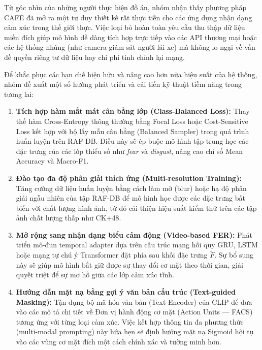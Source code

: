 Từ góc nhìn của những người thực hiện đồ án, nhóm nhận thấy phương pháp CAFE đã mở ra một tư duy thiết kế rất thực tiễn cho các ứng dụng nhận dạng cảm xúc trong thế giới thực. Việc loại bỏ hoàn toàn yêu cầu thu thập dữ liệu miền đích giúp mô hình dễ dàng tích hợp trực tiếp vào các API thương mại hoặc các hệ thống nhúng (như camera giám sát người lái xe) mà không lo ngại về vấn đề quyền riêng tư dữ liệu hay chi phí tinh chỉnh lại mạng.

Để khắc phục các hạn chế hiện hữu và nâng cao hơn nữa hiệu suất của hệ thống, nhóm đề xuất một số hướng phát triển và cải tiến kỹ thuật tiềm năng trong tương lai:

\begin{enumerate}
    \item \textbf{Tích hợp hàm mất mát cân bằng lớp (Class-Balanced Loss):} Thay thế hàm Cross-Entropy thông thường bằng Focal Loss hoặc Cost-Sensitive Loss kết hợp với bộ lấy mẫu cân bằng (Balanced Sampler) trong quá trình huấn luyện trên RAF-DB. Điều này sẽ ép buộc mô hình tập trung học các đặc trưng của các lớp thiểu số như \textit{fear} và \textit{disgust}, nâng cao chỉ số Mean Accuracy và Macro-F1.
    \item \textbf{Đào tạo đa độ phân giải thích ứng (Multi-resolution Training):} Tăng cường dữ liệu huấn luyện bằng cách làm mờ (blur) hoặc hạ độ phân giải ngẫu nhiên của tập RAF-DB để mô hình học được các đặc trưng bất biến với chất lượng hình ảnh, từ đó cải thiện hiệu suất kiểm thử trên các tập ảnh chất lượng thấp như CK+48.
    \item \textbf{Mở rộng sang nhận dạng biểu cảm động (Video-based FER):} Phát triển mô-đun temporal adapter dựa trên cấu trúc mạng hồi quy GRU, LSTM hoặc mạng tự chú ý Transformer đặt phía sau khối đặc trưng $\tilde{F}$. Sự bổ sung này sẽ giúp mô hình bắt giữ được sự thay đổi cơ mặt theo thời gian, giải quyết triệt để sự mơ hồ giữa các lớp cảm xúc tĩnh.
    \item \textbf{Hướng dẫn mặt nạ bằng gợi ý văn bản cấu trúc (Text-guided Masking):} Tận dụng bộ mã hóa văn bản (Text Encoder) của CLIP để đưa vào các mô tả chi tiết về Đơn vị hành động cơ mặt (Action Units --- FACS) tương ứng với từng loại cảm xúc. Việc kết hợp thông tin đa phương thức (multi-modal prompting) này hứa hẹn sẽ định hướng mặt nạ Sigmoid hội tụ vào các vùng cơ mặt đích một cách chính xác và tường minh hơn.
\end{enumerate}

